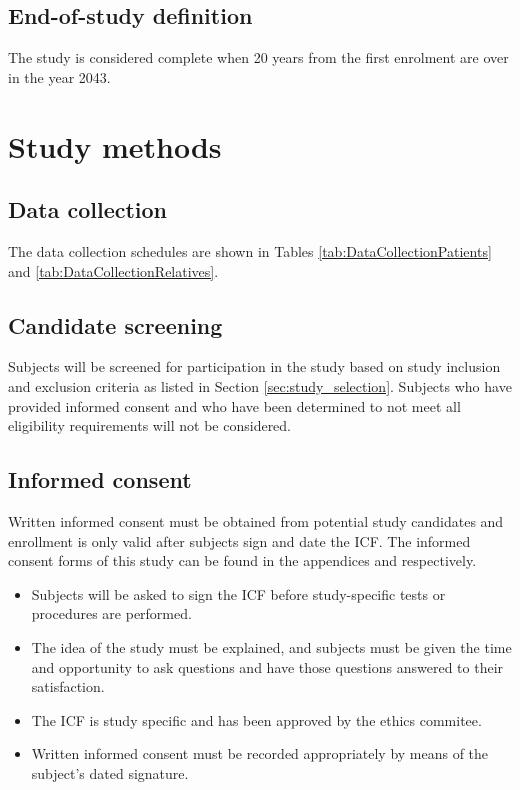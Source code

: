 \subsection{End-of-study definition}
The study is considered complete when 20 years from the first enrolment are over in the year 2043.

\section{Study methods}
\subsection{Data collection}
The data collection schedules are shown in Tables \ref{tab:DataCollectionPatients} and \ref{tab:DataCollectionRelatives}.

\subsection{Candidate screening}
\label{subsec:screening}
Subjects will be screened for participation in the study based on study inclusion and exclusion criteria as listed in Section \ref{sec:study_selection}. Subjects who have provided informed consent and who have been determined to not meet all eligibility requirements will not be considered.

\subsection{Informed consent}
Written informed consent must be obtained from potential study candidates and enrollment is only valid after subjects sign and date the \ac{ICF}. The informed consent forms of this study can be found in the appendices \label{sec:icf_patient} and \label{sec:icf_relative} respectively.

\begin{itemize}[noitemsep, topsep=0pt]
\item Subjects will be asked to sign the \ac{ICF} before study-specific tests or procedures are performed.
\item The idea of the study must be explained, and subjects must be given the time and opportunity to ask questions and have those questions answered to their satisfaction.
\item The \ac{ICF} is study specific and has been approved by the ethics commitee.
\item Written informed consent must be recorded appropriately by means of the subject’s dated signature.
\end{itemize}

